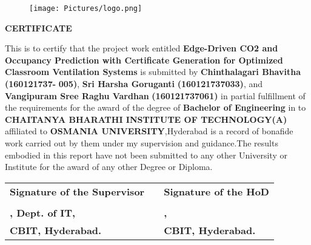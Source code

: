 \thispagestyle{fancy}

\begin{center}
\begin{figure}[h!]
	\centering
	\texttt{[image: Pictures/logo.png]}
	
\end{figure}

	\vspace{0.5cm}
	\Large{\textbf{CERTIFICATE}}
\end{center}

\vspace{0.3cm}

\noindent
\fontsize{12pt}{24pt}\selectfont This is to certify that the project work entitled \textbf{Edge-Driven CO2 and Occupancy Prediction with Certificate Generation for Optimized Classroom Ventilation Systems} is submitted by	\textbf{Chinthalagari Bhavitha } \textbf{(160121737-}
 \textbf{005)},
\textbf{Sri Harsha Goruganti} \textbf{(160121737033)}, and
\textbf{Vangipuram Sree Raghu Vardhan} \textbf{(160121737061)}  in partial fulfillment of the requirements for the award of the degree of \textbf{Bachelor of Engineering} in \textbf{\projectdept} to \textbf{CHAITANYA BHARATHI INSTITUTE OF TECHNOLOGY(A)} affiliated to \textbf{OSMANIA UNIVERSITY},Hyderabad is a record of bonafide work carried out by them under my supervision and guidance.The results embodied in this report have not been submitted to any other University or Institute for the award of any other Degree or Diploma.


\vspace{4cm}

\begin{table}[h!]
	\centering
	{\small
	\begin{tabular}{l C{1cm} l}
    \textbf{Signature of the Supervisor}&& \textbf{Signature of the HoD}\\
		\textbf{\guidename} && \textbf{\depthodname}\\
		\textbf{\guidedesignation, Dept. of IT,} & &\textbf{\depthoddesignation,}\\
	\textbf{CBIT, Hyderabad.} & &\textbf{CBIT, Hyderabad.}\\
	\end{tabular}
	}
\end{table}



